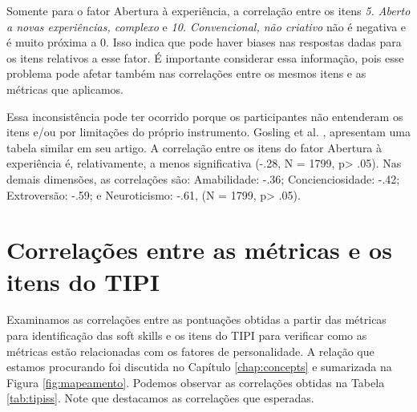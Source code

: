Somente para o fator Abertura à experiência, a correlação entre os itens \textit{5. Aberto a novas experiências, complexo} e \textit{10. Convencional, não criativo} não é negativa e é muito próxima a 0. Isso indica que pode haver biases nas respostas dadas para os itens relativos a esse fator.
É importante considerar essa informação, pois esse problema pode afetar também nas correlações entre os mesmos itens e as métricas que aplicamos.

Essa inconsistência pode ter ocorrido porque os participantes não entenderam os itens e/ou por limitações do próprio instrumento. Gosling et al. \cite{gosling:03}, apresentam uma tabela similar em seu artigo. A correlação entre os itens do fator Abertura à experiência é, relativamente, a menos significativa (-.28, N = 1799, p> .05).
Nas demais dimensões, as correlações são: Amabilidade: -.36; Concienciosidade: -.42; Extroversão: -.59; e Neuroticismo: -.61, (N = 1799, p> .05).

\section{Correlações entre as métricas e os itens do TIPI}
\label{sec:tipiss}

Examinamos as correlações entre as pontuações obtidas a partir das métricas para identificação das soft skills e os itens do TIPI para verificar como as métricas estão relacionadas com os fatores de personalidade. A relação que estamos procurando foi discutida no Capítulo \ref{chap:concepts} e sumarizada na Figura \ref{fig:mapeamento}.
Podemos observar as correlações obtidas na Tabela \ref{tab:tipiss}. Note que destacamos as correlações que esperadas. 

